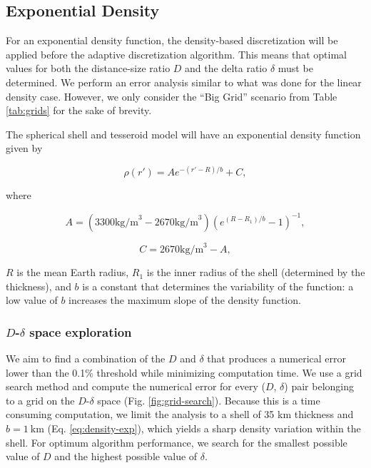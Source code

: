 \documentclass[extra]{gji}
\begin{document}
\subsection{Exponential Density}

For an exponential density function, the density-based discretization will be applied
before the adaptive discretization algorithm.
This means that optimal values for both the distance-size ratio $D$ and the delta ratio
$\delta$ must be determined.
We perform an error analysis similar to what was done for the linear density case.
However, we only consider the ``Big Grid'' scenario from Table \ref{tab:grids} for the
sake of brevity.

The spherical shell and tesseroid model will have an exponential density function given
by

\begin{equation}
    \rho(r') = A e^{-(r' - R)/b} + C,
\label{eq:density-exp}
\end{equation}

\noindent where

\begin{equation}
    A =
    (3300 \text{kg/m}^3 - 2670 \text{kg/m}^3)
    \left( e^{( R - R_1 )/b} - 1 \right)^{-1},
\end{equation}

\begin{equation}
    C =
    2670 \text{kg/m}^3 - A,
\end{equation}

\noindent $R$ is the mean Earth radius, $R_1$ is the inner radius of the
shell (determined by the thickness), and $b$ is a constant that determines the
variability of the function: a low value of $b$ increases the maximum slope of the
density function.


\subsubsection{$D$-$\delta$ space exploration}

We aim to find a combination of the $D$ and $\delta$ that produces a numerical error
lower than the 0.1\% threshold while minimizing computation time.
We use a grid search method and compute the numerical error for every ($D$, $\delta$)
pair belonging to a grid on the $D$-$\delta$ space (Fig. \ref{fig:grid-search}).
Because this is a time consuming computation, we limit the analysis to a shell of 35 km
thickness and $b = 1\ \text{km}$ (Eq. \ref{eq:density-exp}), which yields a
sharp density variation within the shell.
For optimum algorithm performance, we search for the smallest possible value of $D$ and
the highest possible value of $\delta$.
\end{document}
